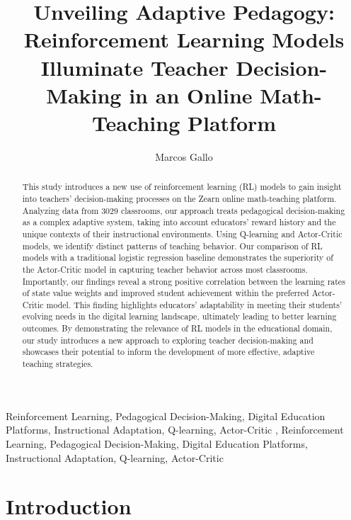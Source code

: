 \documentclass[
  number,
  preprint,
  3p,
  onecolumn]{elsarticle}
\begin{document}
\begin{frontmatter}
\title{Unveiling Adaptive Pedagogy: Reinforcement Learning Models
Illuminate Teacher Decision-Making in an Online Math-Teaching Platform}
\author[]{Marcos Gallo%
%
}




        
\begin{abstract}
This study introduces a new use of reinforcement learning (RL) models to
gain insight into teachers' decision-making processes on the Zearn
online math-teaching platform. Analyzing data from 3029 classrooms, our
approach treats pedagogical decision-making as a complex adaptive
system, taking into account educators' reward history and the unique
contexts of their instructional environments. Using Q-learning and
Actor-Critic models, we identify distinct patterns of teaching behavior.
Our comparison of RL models with a traditional logistic regression
baseline demonstrates the superiority of the Actor-Critic model in
capturing teacher behavior across most classrooms. Importantly, our
findings reveal a strong positive correlation between the learning rates
of state value weights and improved student achievement within the
preferred Actor-Critic model. This finding highlights educators'
adaptability in meeting their students' evolving needs in the digital
learning landscape, ultimately leading to better learning outcomes. By
demonstrating the relevance of RL models in the educational domain, our
study introduces a new approach to exploring teacher decision-making and
showcases their potential to inform the development of more effective,
adaptive teaching strategies.
\end{abstract}





\begin{keyword}
    Reinforcement Learning, Pedagogical Decision-Making, Digital
Education Platforms, Instructional Adaptation, Q-learning,
Actor-Critic \sep 
    Reinforcement Learning, Pedagogical Decision-Making, Digital
Education Platforms, Instructional Adaptation, Q-learning, Actor-Critic
\end{keyword}
\end{frontmatter}
    

\section{Introduction}\label{introduction}
\end{document}
